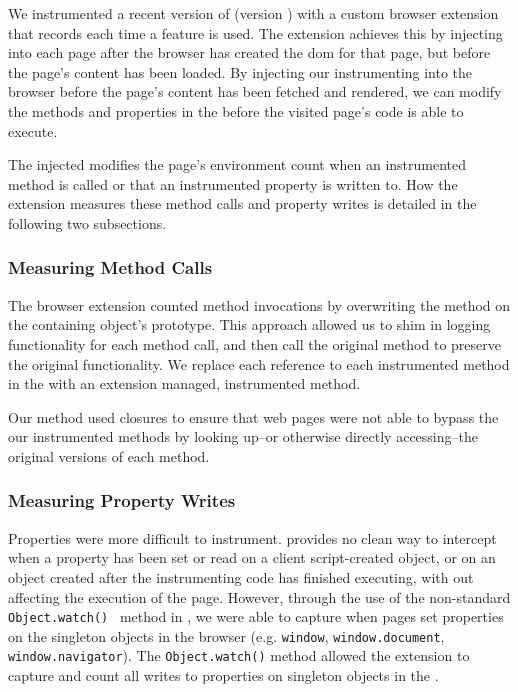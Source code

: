 We instrumented a recent version of \FF (version \FFversion) with a custom
browser extension that records each time a \JS feature is used.  The extension
achieves this by injecting \JS into each page after the browser has created the
\gls{dom} for that page, but before the page's content has been loaded. By
injecting our instrumenting \JS into the browser before the page's content has
been fetched and rendered, we can modify the methods and properties in the
\WAPI before the visited page's code is able to execute.

The injected \JS modifies the page's environment count when an instrumented
method is called or that an instrumented property is written to.  How the
extension measures these method calls and property writes is detailed in the
following two subsections.


\subsubsection{Measuring Method Calls}
The browser extension counted method invocations by overwriting the method on
the containing object's prototype.  This approach allowed us to shim in
logging functionality for each method call, and then call the original method
to preserve the original functionality.  We replace each reference to each
instrumented method in the \WAPI with an extension managed, instrumented
method.

Our method used \JS closures to ensure that web pages were not able to bypass
the our instrumented methods by looking up--or otherwise directly
accessing--the original versions of each method.


\subsubsection{Measuring Property Writes}
Properties were more difficult to instrument.  \JS provides no clean way to
intercept when a property has been set or read on a client script-created object,
or on an object created after the instrumenting code has finished executing, with
out affecting the execution of the page.  However, through the use of the
non-standard \texttt{Object.watch()}~\cite{mozillaobjectwatch} method in \FF,
we were able to capture when pages set properties on the singleton objects in
the browser (e.g. \texttt{window}, \texttt{window.document},
\texttt{window.navigator}).  The \texttt{Object.watch()} method allowed
the extension to capture and count all writes to properties on singleton
objects in the \WAPI.

